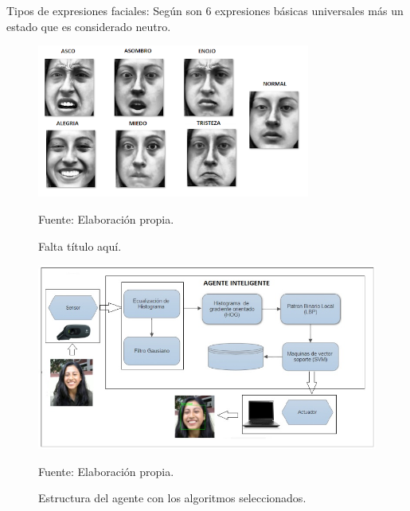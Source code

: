 \begin{itemize}
Tipos de expresiones faciales: \vskip 0.1cm
Según \cite{Ekman} son 6 expresiones básicas universales más un estado que es considerado neutro.

\begin{figure}[ht]
\begin{center}
\includegraphics[width=0.8\textwidth]{Imagen30}
\end{center}
\begin{center}
\vskip -0.5cm
\caption{\small{Falta título aquí.}}
{\small{Fuente: Elaboración propia.}}
\end{center}
\end{figure}

\begin{figure}[ht]
\begin{center}
\includegraphics[width=1\textwidth]{Imagen31}
\end{center}
\begin{center}
\vskip -0.5cm
\caption{\small{Estructura del agente con los algoritmos seleccionados.}}
{\small{Fuente: Elaboración propia.}}
\end{center}
\end{figure}

\end{itemize}

